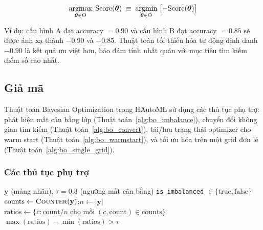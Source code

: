 \documentclass[12pt,a4paper]{article}
\newcommand{\argmax}{\operatornamewithlimits{argmax}}
\newcommand{\argmin}{\operatornamewithlimits{argmin}}
\begin{document}
\begin{equation}
    \argmax_{\boldsymbol{\theta} \in \Theta}\;
    \text{Score}(\boldsymbol{\theta})
    \;\equiv\;
    \argmin_{\boldsymbol{\theta} \in \Theta}\;
    \bigl[-\text{Score}(\boldsymbol{\theta})\bigr]
    \label{eq:negation}
\end{equation}

\noindent Ví dụ: cấu hình A đạt accuracy $= 0.90$ và cấu hình B đạt accuracy
$= 0.85$ sẽ được ánh xạ thành $-0.90$ và $-0.85$. Thuật toán tối thiểu hóa tự
động định danh $-0.90$ là kết quả ưu việt hơn, bảo đảm tính nhất quán với mục
tiêu tìm kiếm điểm số cao nhất.

\subsection{Giả mã}

Thuật toán Bayesian Optimization trong HAutoML sử dụng các thủ tục phụ trợ:
phát hiện mất cân bằng lớp (Thuật toán~\ref{alg:bo_imbalance}),
chuyển đổi không gian tìm kiếm (Thuật toán~\ref{alg:bo_convert}),
tải/lưu trạng thái optimizer cho warm start (Thuật toán~\ref{alg:bo_warmstart}),
và tối ưu hóa trên một grid đơn lẻ (Thuật toán~\ref{alg:bo_single_grid}).

\subsubsection{Các thủ tục phụ trợ}

\begin{algorithm}[H]
\caption{Phát hiện mất cân bằng lớp (\textsc{DetectClassImbalance})}
\label{alg:bo_imbalance}
\begin{algorithmic}[1]
\Require $\mathbf{y}$ (mảng nhãn), $\tau = 0.3$ (ngưỡng mất cân bằng)
\Ensure \texttt{is\_imbalanced} $\in \{\text{true}, \text{false}\}$
\State $\text{counts} \gets \textsc{Counter}(\mathbf{y})$;\quad $n \gets |\mathbf{y}|$
\State $\text{ratios} \gets \{c: \text{count}/n \;\text{cho mỗi}\; (c, \text{count}) \in \text{counts}\}$
\State \Return $\max(\text{ratios}) - \min(\text{ratios}) > \tau$
\end{algorithmic}
\end{algorithm}
\end{document}
